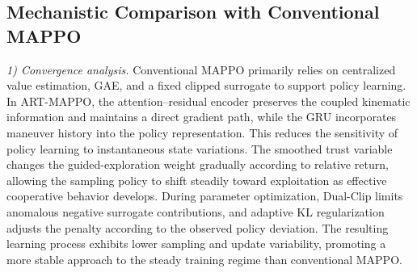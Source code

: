 \documentclass[lettersize,journal]{IEEEtran}
\newcommand{\hladd}[1]{{\color{blue}#1}}
\begin{document}



\subsection{\hladd{Mechanistic Comparison with Conventional MAPPO}}
\label{subsec:theory_comparison}

\hladd{\emph{1) Convergence analysis.}
Conventional MAPPO primarily relies on centralized value estimation, GAE, and
a fixed clipped surrogate to support policy learning. In ART-MAPPO, the
attention--residual encoder preserves the coupled kinematic information and
maintains a direct gradient path, while the GRU incorporates maneuver history
into the policy representation. This reduces the sensitivity of policy learning
to instantaneous state variations. The smoothed trust variable changes the
guided-exploration weight gradually according to relative return, allowing the
sampling policy to shift steadily toward exploitation as effective cooperative
behavior develops. During parameter optimization, Dual-Clip limits anomalous
negative surrogate contributions, and adaptive KL regularization adjusts the
penalty according to the observed policy deviation. The resulting learning
process exhibits lower sampling and update variability, promoting a more stable
approach to the steady training regime than conventional MAPPO.}
\end{document}
